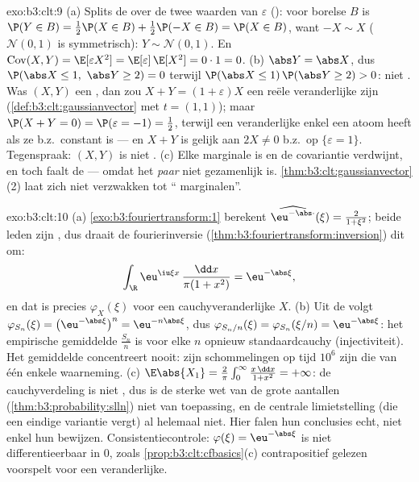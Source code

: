 \begin{solution}{exo:b3:clt:9}
(a) Splits de  over de twee waarden van
$\varepsilon$ (): voor borelse $B$ is $\P(Y
\in B) = \frac12\P(X \in B) + \frac12\P(-X \in B) = \P(X
\in B)$, want $-X \sim X$ ($\mathcal N(0,1)$ is
symmetrisch): $Y \sim \mathcal N(0,1)$. En
$\operatorname{Cov}(X, Y) = \E[\varepsilon X^2] =
\E[\varepsilon]\,\E[X^2] = 0 \cdot 1 = 0$.
(b) $\abs Y = \abs X$, dus $\P(\abs X \leq 1,\ \abs Y \geq
2) = 0$ terwijl $\P(\abs X \leq 1)\,\P(\abs Y \geq 2) > 0$:
niet . Was $(X, Y)$ een , dan
zou $X + Y = (1 + \varepsilon)X$ een reële 
veranderlijke zijn (\cref{def:b3:clt:gaussianvector} met $t
= (1,1)$); maar $\P(X + Y = 0) = \P(\varepsilon = -1) =
\frac12$, terwijl een  veranderlijke enkel een
atoom heeft als ze b.z.\ constant is --- en $X + Y$ is
gelijk aan $2X \neq 0$ b.z.\ op $\{\varepsilon = 1\}$.
Tegenspraak: $(X, Y)$ is niet .
(c) Elke marginale is  en de covariantie
verdwijnt, en toch faalt de  --- omdat het
\emph{paar} niet gezamenlijk  is.
\cref{thm:b3:clt:gaussianvector}(2) laat zich niet
verzwakken tot `` marginalen''.
\end{solution}

\begin{solution}{exo:b3:clt:10}
(a) \cref{exo:b3:fouriertransform:1} berekent
$\widehat{\eu^{-\abs\cdot}}(\xi) = \frac{2}{1 + \xi^2}$;
beide leden zijn , dus draait de
fourierinversie
(\cref{thm:b3:fouriertransform:inversion}) dit om:
\[
\int_\R\eu^{\iu\xi x}\,\frac{\dd x}{\pi(1 + x^2)} =
\eu^{-\abs\xi},
\]
en dat is precies $\varphi_X(\xi)$ voor een
cauchyveranderlijke $X$.
(b) Uit de  volgt $\varphi_{S_n}(\xi) =
\bigl(\eu^{-\abs\xi}\bigr)^n = \eu^{-n\abs\xi}$, dus
$\varphi_{S_n/n}(\xi) = \varphi_{S_n}(\xi/n) =
\eu^{-\abs\xi}$: het empirische gemiddelde $\frac{S_n}n$ is
voor elke $n$ opnieuw standaardcauchy (injectiviteit). Het
gemiddelde concentreert nooit: zijn schommelingen op tijd
$10^6$ zijn die van één enkele waarneming.
(c) $\E\abs{X_1} = \frac2\pi\int_0^\infty\frac{x\,\dd x}{1 +
x^2} = +\infty$: de cauchyverdeling is niet ,
dus is de sterke wet van de grote aantallen
(\cref{thm:b3:probability:slln}) niet van toepassing, en de
centrale limietstelling (die een eindige variantie vergt)
al helemaal niet. Hier falen hun conclusies echt, niet
enkel hun bewijzen. Consistentiecontrole: $\varphi(\xi) =
\eu^{-\abs\xi}$ is niet differentieerbaar in $0$, zoals
\cref{prop:b3:clt:cfbasics}(c) contrapositief gelezen
voorspelt voor een  veranderlijke.
\end{solution}

